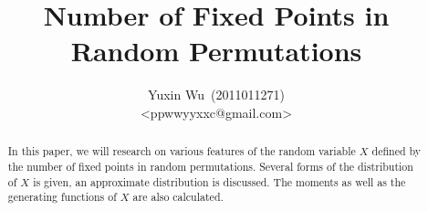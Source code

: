 \documentclass[a4paper]{article}
\title{Number of Fixed Points in Random Permutations}
\author{Yuxin Wu~(2011011271)\\<ppwwyyxxc@gmail.com>}
\begin{document}
\maketitle
\begin{abstract}
  In this paper, we will research on various features of the random variable $X$
  defined by the number of fixed points in random permutations.
  Several forms of the distribution of $X$ is given, an approximate distribution is discussed.
  The moments as well as the generating functions of $X$ are also calculated.
\end{abstract}
\tableofcontents
\newpage







\end{document}
